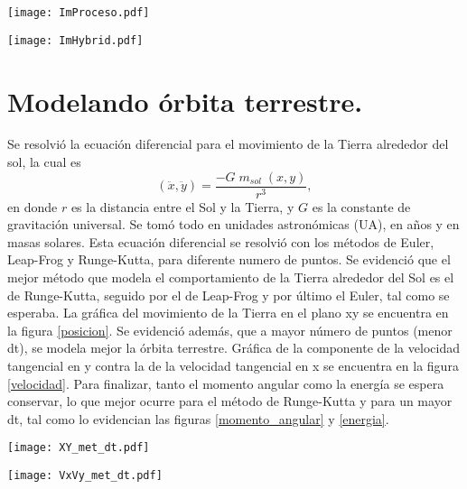 \documentclass[preprint,12pt]{elsarticle}
\begin{document}
\begin{figure*}[h!] 
\centering
\texttt{[image: ImProceso.pdf]}
\caption{Espectros de las frecuencias y de sus filtros.}
\label{espectro_frecuencias}
\end{figure*}

\begin{figure*}[h!] 
\centering
\texttt{[image: ImHybrid.pdf]}
\caption{Imagen híbrida.}
\label{hibrida}
\end{figure*}


\section{Modelando órbita terrestre.}
Se resolvió la ecuación diferencial para el movimiento de la Tierra alrededor del sol, la cual es 
$$ (\ddot{x}, \ddot{y}) = \frac{-G \; m_{sol} \; (x, y)}{r^3} ,$$ 
en donde $r$ es la distancia entre el Sol y la Tierra, y $G$ es la constante de gravitación universal. Se tomó todo en unidades astronómicas (UA), en años y en masas solares. Esta ecuación diferencial se resolvió con los métodos de Euler, Leap-Frog y Runge-Kutta, para diferente numero de puntos. Se evidenció que el mejor método que modela el comportamiento de la Tierra alrededor del Sol es el de Runge-Kutta, seguido por el de Leap-Frog y por último el Euler, tal como se esperaba. La gráfica del movimiento de la Tierra en el plano xy se encuentra en la figura \ref{posicion}. Se evidenció además, que a mayor número de puntos (menor dt), se modela mejor la órbita terrestre. Gráfica de la componente de la velocidad tangencial en y contra la de la velocidad tangencial en x se encuentra en la figura \ref{velocidad}. Para finalizar, tanto el momento angular como la energía se espera conservar, lo que mejor ocurre para el método de Runge-Kutta y para un mayor dt, tal como lo evidencian las figuras \ref{momento_angular} y \ref{energia}.

\begin{figure*}[h!] 
\centering
\texttt{[image: XY\_met\_dt.pdf]}
\caption{Posiciones de la tierra durante 20 órbitas por medio de los métodos de integración de Euler, Leap-frog y Runge-Kutta, y para 3 dt diferentes.}
\label{posicion}
\end{figure*}

\begin{figure*}[h!] 
\centering
\texttt{[image: VxVy\_met\_dt.pdf]}
\caption{Componente de la velocidad en y contra la componente de la velocidad en x, para los 3 métodos de integración usados y para 3 dt diferentes.}
\label{velocidad}
\end{figure*}
\end{document}
